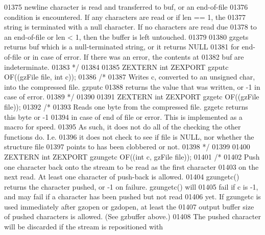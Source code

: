 \begin{DoxyCode}
01375 \textcolor{comment}{   newline character is read and transferred to buf, or an end-of-file}
01376 \textcolor{comment}{   condition is encountered.  If any characters are read or if len == 1, the}
01377 \textcolor{comment}{   string is terminated with a null character.  If no characters are read due}
01378 \textcolor{comment}{   to an end-of-file or len < 1, then the buffer is left untouched.}
01379 \textcolor{comment}{}
01380 \textcolor{comment}{     gzgets returns buf which is a null-terminated string, or it returns NULL}
01381 \textcolor{comment}{   for end-of-file or in case of error.  If there was an error, the contents at}
01382 \textcolor{comment}{   buf are indeterminate.}
01383 \textcolor{comment}{*/}
01384 
01385 ZEXTERN \textcolor{keywordtype}{int} ZEXPORT gzputc OF((gzFile file, \textcolor{keywordtype}{int} c));
01386 \textcolor{comment}{/*}
01387 \textcolor{comment}{     Writes c, converted to an unsigned char, into the compressed file.  gzputc}
01388 \textcolor{comment}{   returns the value that was written, or -1 in case of error.}
01389 \textcolor{comment}{*/}
01390 
01391 ZEXTERN \textcolor{keywordtype}{int} ZEXPORT gzgetc OF((gzFile file));
01392 \textcolor{comment}{/*}
01393 \textcolor{comment}{     Reads one byte from the compressed file.  gzgetc returns this byte or -1}
01394 \textcolor{comment}{   in case of end of file or error.  This is implemented as a macro for speed.}
01395 \textcolor{comment}{   As such, it does not do all of the checking the other functions do.  I.e.}
01396 \textcolor{comment}{   it does not check to see if file is NULL, nor whether the structure file}
01397 \textcolor{comment}{   points to has been clobbered or not.}
01398 \textcolor{comment}{*/}
01399 
01400 ZEXTERN \textcolor{keywordtype}{int} ZEXPORT gzungetc OF((\textcolor{keywordtype}{int} c, gzFile file));
01401 \textcolor{comment}{/*}
01402 \textcolor{comment}{     Push one character back onto the stream to be read as the first character}
01403 \textcolor{comment}{   on the next read.  At least one character of push-back is allowed.}
01404 \textcolor{comment}{   gzungetc() returns the character pushed, or -1 on failure.  gzungetc() will}
01405 \textcolor{comment}{   fail if c is -1, and may fail if a character has been pushed but not read}
01406 \textcolor{comment}{   yet.  If gzungetc is used immediately after gzopen or gzdopen, at least the}
01407 \textcolor{comment}{   output buffer size of pushed characters is allowed.  (See gzbuffer above.)}
01408 \textcolor{comment}{   The pushed character will be discarded if the stream is repositioned with}

\end{DoxyCode}
